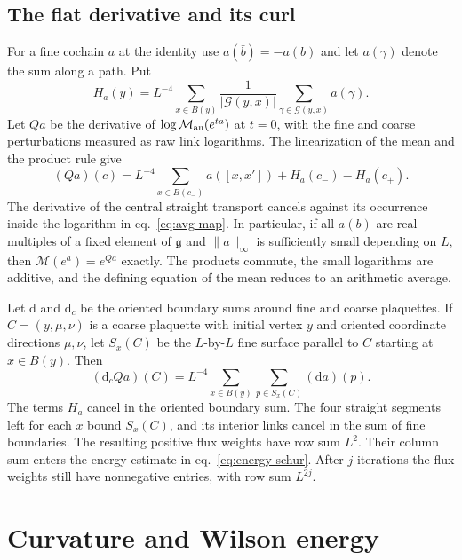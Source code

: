 \documentclass[11pt,letterpaper,reqno]{amsart}
\numberwithin{equation}{section}
\renewcommand{\eqref}[1]{\textup{eq.~\ref{#1}}}
\theoremstyle{definition}
\theoremstyle{remark}
\begin{document}
\subsection{The flat derivative and its curl}

For a fine cochain \(a\) at the identity use \(a(\bar b)=-a(b)\)
and let \(a(\gamma)\) denote the sum along a path. Put
\[
 H_a(y)=L^{-4}\sum_{x\in B(y)}
       \frac1{|\mathcal G(y,x)|}\sum_{\gamma\in\mathcal G(y,x)}a(\gamma).
\]
Let \(Q a\) be the derivative of \(\log\mathcal M_{\rm an}(e^{ta})\) at \(t=0\),
with the fine and coarse perturbations measured as raw link
logarithms. The linearization of the mean and the product rule give
\begin{equation}
 (Qa)(c)=L^{-4}\sum_{x\in B(c_-)}a([x,x'])
                           +H_a(c_-)-H_a(c_+).
 \label{eq:avg-flat-link}
\end{equation}
The derivative of the central straight transport cancels against
its occurrence inside the logarithm in \eqref{eq:avg-map}.
In particular, if all \(a(b)\) are real multiples of a fixed element
of \(\mathfrak g\) and \(\|a\|_\infty\) is sufficiently small
depending on \(L\), then \(\mathcal M(e^a)=e^{Qa}\) exactly.
The products commute, the small logarithms are additive, and
the defining equation of the mean reduces to an arithmetic average.

Let \(\mathrm d\) and \(\mathrm d_c\) be the oriented boundary
sums around fine and coarse plaquettes. If \(C=(y,\mu,\nu)\) is a
coarse plaquette with initial vertex \(y\) and oriented coordinate
directions \(\mu,\nu\), let \(S_x(C)\) be the \(L\)-by-\(L\) fine
surface parallel to \(C\) starting at \(x\in B(y)\). Then
\begin{equation}
 (\mathrm d_cQa)(C)=L^{-4}\sum_{x\in B(y)}\sum_{p\in S_x(C)}
                         (\mathrm da)(p).
 \label{eq:avg-flat-curl}
\end{equation}
The terms \(H_a\) cancel in the oriented boundary sum. The four
straight segments left for each \(x\) bound \(S_x(C)\), and its
interior links cancel in the sum of fine boundaries. The resulting
positive flux weights have row sum \(L^2\). Their column sum
enters the energy estimate in \eqref{eq:energy-schur}.
After \(j\) iterations the flux weights still have nonnegative
entries, with row sum \(L^{2j}\).


\section{Curvature and Wilson energy}\label{sec:energy}
\end{document}
